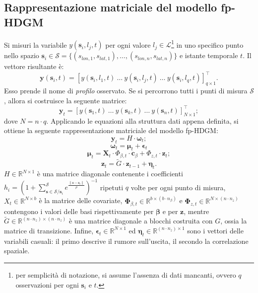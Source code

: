 \subsection[Rappresentazione matriciale del modello fp-HDGM]{Rappresentazione matriciale del modello fp-HDGM}
Si misuri la variabile $y(\mathbf{s}_i, l_j, t)$ per ogni valore $l_j\in \mathcal{L}$\footnote{per semplicità di notazione, si assume l'assenza di dati mancanti, ovvero $q$ osservazioni per ogni $\mathbf{s}_i$ e $t$.} in uno specifico punto nello spazio $\mathbf{s}_i\in\mathcal{S} = \{(s_{lon,1}, s_{lat,1}),\dots,(s_{lon,n}, s_{lat,n})\}$ e istante temporale $t$. Il vettore risultante è:
\[
\mathbf{y}(\mathbf{s}_i, t) = \left[ y(\mathbf{s}_i, l_1, t) \ \dots \ y(\mathbf{s}_i, l_j, t) \ \dots \ y(\mathbf{s}_i, l_q, t) \right]^\top_{q\times 1}.
\]
Esso prende il nome di \textit{profilo} osservato. Se si percorrono tutti i punti di misura $\mathcal{S}$, allora si costruisce la seguente matrice:
\[
\mathbf{y}_t = \left[ {y}(\mathbf{s}_1, t) \ \dots \ {y}(\mathbf{s}_k, t) \ \dots \ {y}(\mathbf{s}_n, t) \right]^\top_{N\times 1};
\]
dove $N=n\cdot q$. Applicando le equazioni alla struttura dati appena definita, si ottiene la seguente rappresentazione matriciale del modello fp-HDGM:
\begin{equation}
	\mathbf{y}_t = H\cdot\boldsymbol{\omega}_t;
	\label{eq_matriciale_y_fp_HDGM}
\end{equation}
\begin{equation}
	\boldsymbol{\omega}_t = \boldsymbol{\mu}_t + \boldsymbol{\epsilon}_t
\end{equation}
\begin{equation}
	\boldsymbol{\mu}_t = \mathbf{X}_t\cdot\Phi_{\beta, t}\cdot\mathbf{c}_\beta + \Phi_{z, t}\cdot\mathbf{z}_t;
\end{equation}
\begin{equation}
	\mathbf{z}_t = \tilde{G}\cdot\mathbf{z}_{t-1} + \boldsymbol{\eta}_t.
	\label{eq_matriciale_z_fp_HDGM}
\end{equation}
$H\in\mathbb{R}^{N\times 1}$ è una matrice diagonale contenente i coefficienti $h_i = \left( 1 + \sum_{\mathbf{s}\in\mathcal{S}/\mathbf{s}_i}^{\mathcal{S}} e^{\frac{\|\mathbf{s} - \mathbf{s}_i\|}{\rho}}\right)^{-1}$ ripetuti $q$ volte per ogni punto di misura, $X_t\in\mathbb{R}^{N\times b}$ è la matrice delle covariate, $\boldsymbol{\Phi}_{\beta, t}\in\mathbb{R}^{b\times (b\cdot n_\beta)}$ e $\boldsymbol{\Phi}_{z, t}\in\mathbb{R}^{N\times(n\cdot n_z)}$ contengono i valori delle basi rispettivamente per $\boldsymbol{\beta}$ e per $\mathbf{z}$, mentre $\tilde{G}\in\mathbb{R}^{(n\cdot n_z)\times (n\cdot n_z)}$ è una matrice diagonale a blocchi costruita con $G$, ossia la matrice di transizione. Infine, $\boldsymbol{\epsilon}_t\in\mathbb{R}^{N\times 1}$ ed $\boldsymbol{\eta}_t\in\mathbb{R}^{(n\cdot n_z)\times 1}$ sono i vettori delle variabili casuali: il primo descrive il rumore sull'uscita, il secondo la correlazione spaziale.

